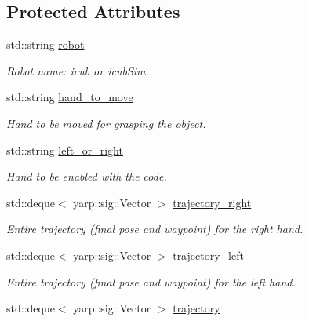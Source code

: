 \subsection*{Protected Attributes}
\begin{DoxyCompactItemize}
\item 
std\+::string \hyperlink{classGraspExecution_add1ccc7979dfd444774874ef45acfbef}{robot}\label{classGraspExecution_add1ccc7979dfd444774874ef45acfbef}

\begin{DoxyCompactList}\small\item\em Robot name\+: icub or icub\+Sim. \end{DoxyCompactList}\item 
std\+::string \hyperlink{classGraspExecution_af8666e0e45d0a8f41d494bf7d5fab41d}{hand\+\_\+to\+\_\+move}\label{classGraspExecution_af8666e0e45d0a8f41d494bf7d5fab41d}

\begin{DoxyCompactList}\small\item\em Hand to be moved for grasping the object. \end{DoxyCompactList}\item 
std\+::string \hyperlink{classGraspExecution_acfb5fa41f061241d0340c3127d445424}{left\+\_\+or\+\_\+right}\label{classGraspExecution_acfb5fa41f061241d0340c3127d445424}

\begin{DoxyCompactList}\small\item\em Hand to be enabled with the code. \end{DoxyCompactList}\item 
std\+::deque$<$ yarp\+::sig\+::\+Vector $>$ \hyperlink{classGraspExecution_abe1a87e13aeb08a0b0a76c5627221638}{trajectory\+\_\+right}\label{classGraspExecution_abe1a87e13aeb08a0b0a76c5627221638}

\begin{DoxyCompactList}\small\item\em Entire trajectory (final pose and waypoint) for the right hand. \end{DoxyCompactList}\item 
std\+::deque$<$ yarp\+::sig\+::\+Vector $>$ \hyperlink{classGraspExecution_ad322d77c2ef8fac21c352d1f3fe31038}{trajectory\+\_\+left}\label{classGraspExecution_ad322d77c2ef8fac21c352d1f3fe31038}

\begin{DoxyCompactList}\small\item\em Entire trajectory (final pose and waypoint) for the left hand. \end{DoxyCompactList}\item 
std\+::deque$<$ yarp\+::sig\+::\+Vector $>$ \hyperlink{classGraspExecution_a406d5c4ebc26f79b7a30af4854bbda48}{trajectory}\label{classGraspExecution_a406d5c4ebc26f79b7a30af4854bbda48}


\end{DoxyCompactItemize}
